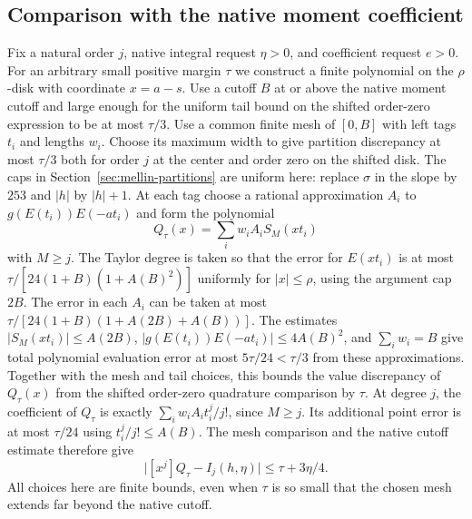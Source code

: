\documentclass[11pt]{amsart}
\theoremstyle{definition}
\theoremstyle{remark}
\numberwithin{equation}{section}
\begin{document}
\subsection{Comparison with the native moment coefficient}
\label{sec:mellin-moment-comparison}

Fix a natural order \(j\), native integral request
\(\eta>0\), and coefficient request \(e>0\).
For an arbitrary small positive margin \(\tau\) we
construct a finite polynomial on the \(\rho\)-disk
with coordinate \(x=a-s\). Use a cutoff \(B\) at or
above the native moment cutoff and large enough for
the uniform tail bound on the shifted order-zero
expression to be at most \(\tau/3\).
Use a common finite mesh of \([0,B]\) with left tags
\(t_i\) and lengths \(w_i\).
Choose its maximum width to give partition discrepancy
at most \(\tau/3\) both for order \(j\) at the center
and order zero on the shifted disk. The caps in
Section~\ref{sec:mellin-partitions} are uniform here:
replace \(\sigma\) in the slope by \(253\) and
\(|h|\) by \(|h|+1\). At each tag choose a rational
approximation \(A_i\) to \(g(E(t_i))E(-at_i)\) and
form the polynomial
\[
                Q_\tau(x)=\sum_i w_i A_i S_M(xt_i)
\]
with \(M\ge j\).
The Taylor degree is taken so that the error for
\(E(xt_i)\) is at most
\(\tau/[24(1+B)(1+A(B)^2)]\)
uniformly for \(|x|\le\rho\), using the argument
cap \(2B\).
The error in each \(A_i\) can be taken at most
\(\tau/[24(1+B)(1+A(2B)+A(B))]\).
The estimates \( |S_M(xt_i)|\le A(2B)\),
\(|g(E(t_i))E(-at_i)|\le4A(B)^2\),
and \(\sum_i w_i=B\) give total polynomial
evaluation error at most \(5\tau/24<\tau/3\) from
these approximations.
Together with the mesh and tail choices, this bounds
the value discrepancy of \(Q_\tau(x)\) from the
shifted order-zero quadrature comparison by \(\tau\).
At degree \(j\), the coefficient of \(Q_\tau\) is exactly
\(\sum_i w_i A_i t_i^j/j!\), since \(M\ge j\).
Its additional point error is at most \(\tau/24\)
using \(t_i^j/j!\le A(B)\).
The mesh comparison and the native cutoff estimate
therefore give
\begin{equation}\label{eq:auxiliary-mellin-moment}
     \big|[x^j]Q_\tau-I_j(h,\eta)\big|\le \tau+3\eta/4 .
\end{equation}
All choices here are finite bounds, even when \(\tau\)
is so small that the chosen mesh extends far beyond the
native cutoff.
\end{document}
